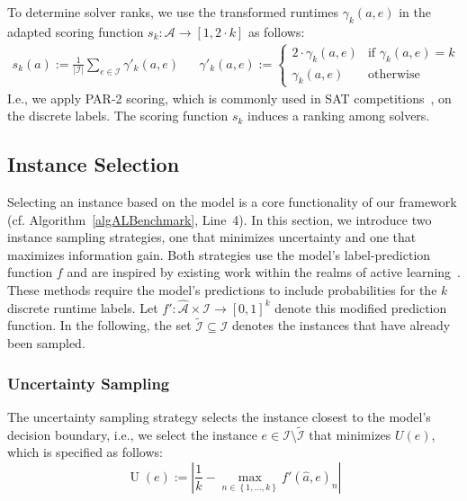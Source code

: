 \documentclass[sn-basic, Numbered]{sn-jnl} %
\begin{document}
To determine solver ranks, we use the transformed runtimes $\gamma_k(a, e)$ in the adapted scoring function $s_k : \mathcal{A} \rightarrow [1, 2 \cdot k]$ as follows:
%
\begin{align}
  s_k(a) := \frac{1}{|\mathcal{I}|} \sum_{e \in \mathcal{I}} \gamma'_k(a, e)
  &&
  \gamma'_k(a, e) := \begin{cases}
    2 \cdot \gamma_k(a, e)   & \text{if } \gamma_k(a, e) = k\\
  \gamma_k(a, e)  & \text{otherwise}
  \end{cases}
  \label{eq:rankingeq}
\end{align}
%
I.e., we apply PAR-2 scoring, which is commonly used in SAT competitions~\cite{FroleyksHIJS21}, on the discrete labels.
The scoring function $s_k$ induces a ranking among solvers.


\subsection{Instance Selection}
\label{sec:main:selection}

Selecting an instance based on the model is a core functionality of our framework (cf. Algorithm~\ref{algALBenchmark}, Line~4).
In this section, we introduce two instance sampling strategies, one that minimizes uncertainty and one that maximizes information gain.
Both strategies use the model's label-prediction function $f$ and are inspired by existing work within the realms of active learning~\cite{settles2009active}.
These methods require the model's predictions to include probabilities for the $k$ discrete runtime labels.
Let \mbox{$f' : \mathcal{\hat A} \times \mathcal{I} \rightarrow \left[0, 1\right]^k$} denote this modified prediction function.
In the following, the set $\tilde{\mathcal{I}} \subseteq \mathcal{I}$ denotes the instances that have already been sampled.

\subsubsection{Uncertainty Sampling}

The uncertainty sampling strategy selects the instance closest to the model's decision boundary, i.e., 
we select the instance $e \in \mathcal{I} \setminus \tilde{\mathcal{I}}$ that minimizes $U(e)$, which is specified as follows:
%
\begin{equation*}
  \operatorname{U}(e) := \left\lvert \frac{1}{k} - \max_{n \in \left\lbrace 1, \dots, k \right\rbrace} f'\!\left(\hat{a}, e\right)_{n} \right\rvert
\end{equation*}
\end{document}
